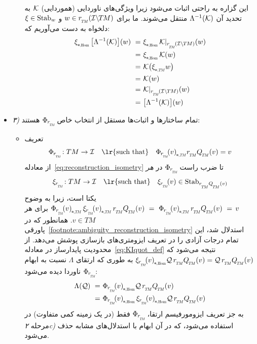 \begin{itemize}[leftmargin=0cm]
\begin{itemize}[leftmargin=1.1cm]
		این گزاره به راحتی اثبات می‌شود زیرا ویژگی‌های ناوردایی (هموردایی) $\mathcal{K}$ به تحدید آن $\Lambda^{-1}(\mathcal{K})$ منتقل می‌شوند.
		ما برای $w\in \rTM(\ITM)$ و $\xi\in \operatorname{Stab}_{w}$ دلخواه به دست می‌آوریم که:
		\begin{align}
			\dxiHom \big[\Lambda^{-1}(\K)\big](w)
			\ =&\ \dxiHom \Krestr (w) \notag \\
			\ =&\ \dxiHom \K(w) \notag \\
			\ =&\ \K \big(\dxiTM w\big) \notag \\
			\ =&\ \K(w) \notag \\
			\ =&\ \Krestr(w) \notag \\
			\ =&\ \big[\Lambda^{-1}(\K)\big](w)
		\end{align}
		
	\end{itemize}
	
	
	
	
	
	
	
	
	
	
	\item[] {\emph{۳)} تمام ساختارها و اثبات‌ها مستقل از انتخاب خاص $\PhirNoArg$ هستند: }
	\begin{itemize}[leftmargin=1.1cm]
		\setlength\itemsep{2ex}
		\item[]%
		تعریف
		\begin{align}
			\PhirNoArg: TM \to \I \quad \textup{\lr{such that}}\quad \dPhirTM{v} \rTM \QTM(v) = v
		\end{align}
		از معادله~\eqref{eq:reconstruction_isometry} تا ضرب راست $\PhirNoArg$ در \emph{هر}
		\begin{align}
			\xirNoArg: TM \to \I \quad \textup{\lr{such that}}\quad \xir{v} \in \Stab{\rTM\QTM(v)}
		\end{align}
		یکتا است، زیرا به وضوح $\dPhirTM{v}\, \dxirTM{v}\, \rTM\QTM(v)\ =\ \dPhirTM{v}\, \rTM\QTM(v)\ =\, v\,$ برای هر $v\in TM$.
		همانطور که در پاورقی~\ref{footnote:ambiguity_reconstruction_isometry} استدلال شد، این تمام درجات آزادی را در تعریف ایزومتری‌های بازسازی پوشش می‌دهد.
		از محدودیت پایدارساز در معادله~\eqref{eq:KIquot_def} نتیجه می‌شود که $\dxirHom{v} \Q\, \rTM\QTM(v) = \Q\, \rTM\QTM(v)$ به طوری که ارتقای $\Lambda$ نسبت به ابهام $\PhirNoArg$ ناوردا دیده می‌شود:
		\begin{align}
			\Lambda(\Q)
			\ =&\ \dPhirHom{v} \Q\, \rTM\QTM(v) \notag \\
			\ =&\ \dPhirHom{v}\, \dxirHom{v} \Q\, \rTM\QTM(v) \notag \\
		\end{align}
		به جز تعریف ایزومورفیسم ارتقا، $\PhirNoArg$ فقط (در یک زمینه کمی متفاوت) در مرحله \textit{۲c)} استفاده می‌شود، که در آن ابهام با استدلال‌های مشابه حذف می‌شود.
		
	\end{itemize}
	
\end{itemize}

